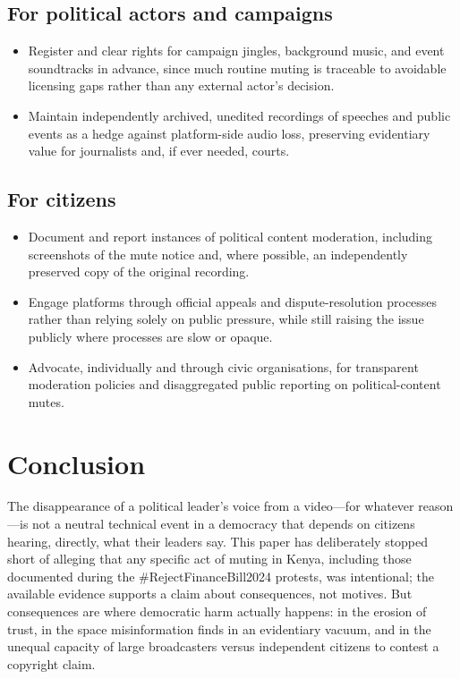\documentclass{article}
\begin{document}
\subsection*{For political actors and campaigns}
\begin{itemize}
\item Register and clear rights for campaign jingles, background music, and event soundtracks in advance, since much routine muting is traceable to avoidable licensing gaps rather than any external actor's decision.
\item Maintain independently archived, unedited recordings of speeches and public events as a hedge against platform-side audio loss, preserving evidentiary value for journalists and, if ever needed, courts.
\end{itemize}

\subsection*{For citizens}
\begin{itemize}
\item Document and report instances of political content moderation, including screenshots of the mute notice and, where possible, an independently preserved copy of the original recording.
\item Engage platforms through official appeals and dispute-resolution processes rather than relying solely on public pressure, while still raising the issue publicly where processes are slow or opaque.
\item Advocate, individually and through civic organisations, for transparent moderation policies and disaggregated public reporting on political-content mutes.
\end{itemize}

\section{Conclusion}

The disappearance of a political leader's voice from a video—for whatever reason—is not a neutral technical event in a democracy that depends on citizens hearing, directly, what their leaders say. This paper has deliberately stopped short of alleging that any specific act of muting in Kenya, including those documented during the \#RejectFinanceBill2024 protests, was intentional; the available evidence supports a claim about consequences, not motives. But consequences are where democratic harm actually happens: in the erosion of trust, in the space misinformation finds in an evidentiary vacuum, and in the unequal capacity of large broadcasters versus independent citizens to contest a copyright claim.
\end{document}
